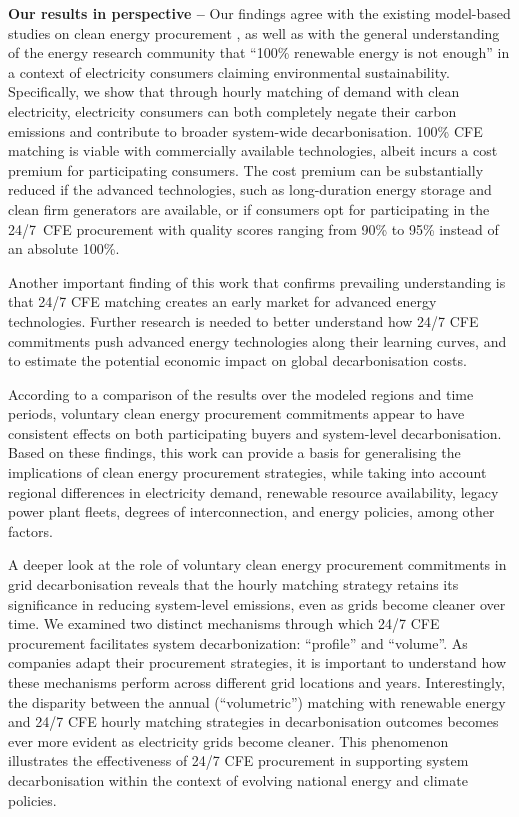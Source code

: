 %

\textbf{Our results in perspective --} Our findings agree with the existing model-based studies on clean energy procurement \cite{xu-247CFE-SSRN,ieaAdvancingDecarbonisationClean2022,peninsula-report247}, as well as with the general understanding of the energy research community that \enquote{100\% renewable energy is not enough} \cite{chalendar-2019} in a context of electricity consumers claiming environmental sustainability. 
Specifically, we show that through hourly matching of demand with clean electricity, electricity consumers can both completely negate their carbon emissions and contribute to broader system-wide decarbonisation. 
100\% CFE matching is viable with commercially available technologies, albeit incurs a cost premium for participating consumers.
The cost premium can be substantially reduced if the advanced technologies, such as long-duration energy storage and clean firm generators are available, or if consumers opt for participating in the 24/7~CFE procurement with quality scores ranging from 90\% to 95\% instead of an absolute 100\%.

Another important finding of this work that confirms prevailing understanding is that 24/7 CFE matching creates an early market for advanced energy technologies. Further research is needed to better understand how 24/7 CFE commitments push advanced energy technologies along their learning curves, and to estimate the potential economic impact on global decarbonisation costs.

According to a comparison of the results over the modeled regions and time periods, voluntary clean energy procurement commitments appear to have consistent effects on both participating buyers and system-level decarbonisation.
Based on these findings, this work can provide a basis for generalising the implications of clean energy procurement strategies, while taking into account regional differences in electricity demand, renewable resource availability, legacy power plant fleets, degrees of interconnection, and energy policies, among other factors.

A deeper look at the role of voluntary clean energy procurement commitments in grid decarbonisation reveals that the hourly matching strategy retains its significance in reducing system-level emissions, even as grids become cleaner over time.
We examined two distinct mechanisms through which 24/7 CFE procurement facilitates system decarbonization: \enquote{profile} and \enquote{volume}.
As companies adapt their procurement strategies, it is important to understand how these mechanisms perform across different grid locations and years.
Interestingly, the disparity between the annual (\enquote{volumetric}) matching with renewable energy and 24/7 CFE hourly matching strategies in decarbonisation outcomes becomes ever more evident as electricity grids become cleaner.
This phenomenon illustrates the effectiveness of 24/7 CFE procurement in supporting system decarbonisation within the context of evolving national energy and climate policies.


